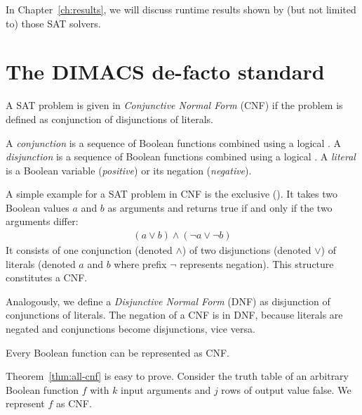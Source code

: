 In Chapter~\ref{ch:results}, we will discuss runtime results shown by (but not limited to)
those SAT solvers.

\section{The DIMACS de-facto standard}
\label{sec:sat-dimacs}
%
\begin{defi}
  A SAT problem is given in \emph{Conjunctive Normal Form} (CNF) if
  the problem is defined as conjunction of disjunctions of literals.

  A \emph{conjunction} is a sequence of Boolean functions combined using
  a logical . A \emph{disjunction} is a sequence of Boolean functions
  combined using a logical . A \emph{literal} is a Boolean variable
  (\emph{positive}) or its negation (\emph{negative}).
\end{defi}

A simple example for a SAT problem in CNF is the exclusive  ().
It takes two Boolean values $a$ and $b$ as arguments and returns true
if and only if the two arguments differ:
{
\setlength{\abovedisplayskip}{5pt}
\setlength{\belowdisplayskip}{5pt}
\setlength{\abovedisplayshortskip}{0pt}
\setlength{\belowdisplayshortskip}{0pt}
\begin{align} (a \lor b) \land (\neg a \lor \neg b) \label{eq:xor}\end{align}
}
It consists of one conjunction (denoted $\land$) of two disjunctions
(denoted $\lor$) of literals (denoted $a$ and $b$ where prefix $\neg$ represents
negation). This structure constitutes a CNF.

Analogously, we define a \emph{Disjunctive Normal Form} (DNF) as disjunction
of conjunctions of literals. The negation of a CNF is in DNF, because literals
are negated and conjunctions become disjunctions, vice versa.

\begin{theorem}
  \label{thm:all-cnf}
  Every Boolean function can be represented as CNF.
\end{theorem}

Theorem~\ref{thm:all-cnf} is easy to prove.
%
Consider the truth table of an arbitrary Boolean function $f$ with $k$ input arguments
and $j$ rows of output value false. We represent $f$ as CNF.

